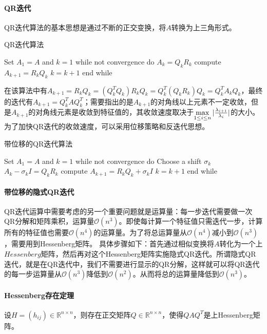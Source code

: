 \documentclass[UTF8]{article}
\begin{document}
\begin{flushleft}
\paragraph{QR迭代}
QR迭代算法的基本思想是通过不断的正交变换，将$A$转换为上三角形式。
\begin{algorithm}[H]
\caption{QR迭代算法}
\begin{algorithmic}[1]
  \State Set $A_1=A$ and $k=1$
  \State while not convergence do
  \State \qquad $A_k=Q_kR_k$     %
  \State \qquad compute $A_{k+1}=R_kQ_k$
  \State \qquad $k=k+1$
  \State end while
\end{algorithmic}
\end{algorithm}
在该算法中有$A_{k+1}=R_kQ_k=(Q_k^TQ_k)R_kQ_k=Q_k^T(Q_kR_k)Q_k=Q_k^TA_kQ_k$，最终的迭代有$A_{k+1}=Q_k^TAQ_k^T$；需要指出的是$A_{k+1}$的对角线以上元素不一定收敛，但是$A_{k+1}$的对角线元素是收敛到特征值的，其收敛速度取决于$\max\limits_{1 \leq i \leq n}\arrowvert \frac{\lambda_{i+1}}{\lambda_i} \arrowvert$的大小。
\bigskip
为了加快QR迭代的收敛速度，可以采用位移策略和反迭代思想。
\begin{algorithm}[H]
\caption{带位移的QR迭代算法}
\begin{algorithmic}[1]
  \State Set $A_1=A$ and $k=1$
  \State while not convergence do
  \State \qquad Choose a shift $\sigma_k$
  \State \qquad $A_k-\sigma_kI=Q_kR_k$     %
  \State \qquad compute $A_{k+1}=R_kQ_k+\sigma_kI$
  \State \qquad $k=k+1$
  \State end while
\end{algorithmic}
\end{algorithm}

\paragraph{带位移的隐式QR迭代}
QR迭代运算中需要考虑的另一个重要问题就是运算量：每一步迭代需要做一次QR分解和矩阵乘积，运算量$\mathcal{O}(n^3)$。即使每计算一个特征值只需迭代一步，计算所有的特征值也需要$\mathcal{O}(n^4)$的运算量。为了将总运算量从$\mathcal{O}(n^4)$减小到$\mathcal{O}(n^3)$，需要用到Hessenberg矩阵。
具体步骤如下：首先通过相似变换将$A$转化为一个上$Hessenberg$矩阵，然后再对这个Hessenberg矩阵实施\textcolor[rgb]{0.00,0.07,1.00}{隐式QR迭代}。所谓隐式QR迭代，就是在QR迭代中，我们不需要进行显示的QR分解，这样就可以将QR迭代的每一步运算量从$\mathcal{O}(n^3)$降低到$\mathcal{O}(n^2)$。从而将总的运算量降低到$\mathcal{O}(n^3)$。

\paragraph{Hessenberg存在定理}
设$H=(h_{ij})\in\mathbb{R}^{n \times n}$，则存在正交矩阵$Q\in\mathbb{R}^{n \times n}$，使得$QAQ^T$是上Hessenberg矩阵。\newline


\end{flushleft}
\end{document}

